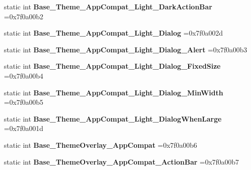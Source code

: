 \begin{DoxyCompactItemize}
static int {\bfseries Base\+\_\+\+Theme\+\_\+\+App\+Compat\+\_\+\+Light\+\_\+\+Dark\+Action\+Bar} =0x7f0a00b2
\item 
\mbox{\label{classandroid_1_1support_1_1v7_1_1appcompat_1_1R_1_1style_a9dc98a81ba6494c229229ae8a2e8bafb}} 
static int {\bfseries Base\+\_\+\+Theme\+\_\+\+App\+Compat\+\_\+\+Light\+\_\+\+Dialog} =0x7f0a002d
\item 
\mbox{\label{classandroid_1_1support_1_1v7_1_1appcompat_1_1R_1_1style_aeda8a74d511f007944e78a2764944a98}} 
static int {\bfseries Base\+\_\+\+Theme\+\_\+\+App\+Compat\+\_\+\+Light\+\_\+\+Dialog\+\_\+\+Alert} =0x7f0a00b3
\item 
\mbox{\label{classandroid_1_1support_1_1v7_1_1appcompat_1_1R_1_1style_a538274f96e5248cf0794b0c00b79f04f}} 
static int {\bfseries Base\+\_\+\+Theme\+\_\+\+App\+Compat\+\_\+\+Light\+\_\+\+Dialog\+\_\+\+Fixed\+Size} =0x7f0a00b4
\item 
\mbox{\label{classandroid_1_1support_1_1v7_1_1appcompat_1_1R_1_1style_aeefb8be5275c9694458545b818fd57c8}} 
static int {\bfseries Base\+\_\+\+Theme\+\_\+\+App\+Compat\+\_\+\+Light\+\_\+\+Dialog\+\_\+\+Min\+Width} =0x7f0a00b5
\item 
\mbox{\label{classandroid_1_1support_1_1v7_1_1appcompat_1_1R_1_1style_a1702389e4b96581c6ce47153e173422e}} 
static int {\bfseries Base\+\_\+\+Theme\+\_\+\+App\+Compat\+\_\+\+Light\+\_\+\+Dialog\+When\+Large} =0x7f0a001d
\item 
\mbox{\label{classandroid_1_1support_1_1v7_1_1appcompat_1_1R_1_1style_a08f6445d68ac21ffa57595c571bef0c6}} 
static int {\bfseries Base\+\_\+\+Theme\+Overlay\+\_\+\+App\+Compat} =0x7f0a00b6
\item 
\mbox{\label{classandroid_1_1support_1_1v7_1_1appcompat_1_1R_1_1style_a96348cccc98c54be1b0a2199d32d5173}} 
static int {\bfseries Base\+\_\+\+Theme\+Overlay\+\_\+\+App\+Compat\+\_\+\+Action\+Bar} =0x7f0a00b7

\end{DoxyCompactItemize}
